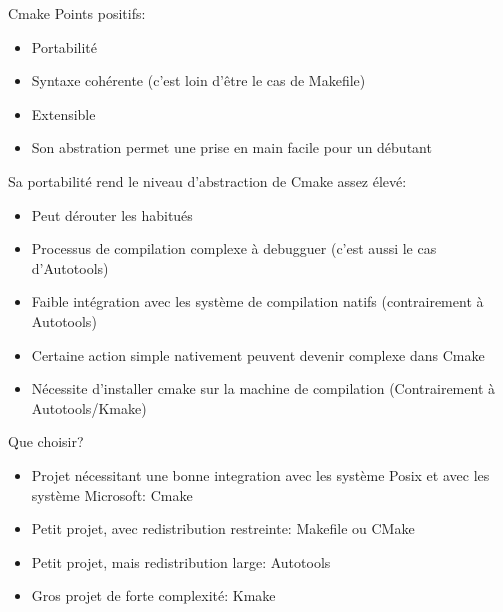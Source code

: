 \begin{frame}[fragile=singleslide]{Cmake}
  Points positifs:
  \begin{itemize}
  \item Portabilité
  \item Syntaxe cohérente (c'est loin d'être le cas de Makefile)
  \item Extensible
  \item  Son  abstration permet  une  prise  en  main facile  pour  un
    débutant
  \end{itemize}
  Sa portabilité rend le niveau d'abstraction de Cmake assez élevé:
  \begin{itemize}
  \item Peut dérouter les habitués
  \item Processus de compilation  complexe à debugguer (c'est aussi le
    cas d'Autotools)
  \item  Faible intégration  avec  les système  de compilation  natifs
    (contrairement à Autotools)
  \item  Certaine action  simple nativement  peuvent  devenir complexe
    dans Cmake
  \item  Nécessite d'installer  cmake  sur la  machine de  compilation
    (Contrairement à Autotools/Kmake)
  \end{itemize}
\end{frame}

\begin{frame}[fragile=singleslide]{Que choisir?}
  \begin{itemize}
  \item  Projet nécessitant  une  bonne integration  avec les  système
    Posix et avec les système Microsoft: Cmake
  \item  Petit  projet, avec  redistribution  restreinte: Makefile  ou
    CMake
  \item Petit projet, mais redistribution large: Autotools
  \item Gros projet de forte complexité: Kmake
  \end{itemize}
\end{frame}